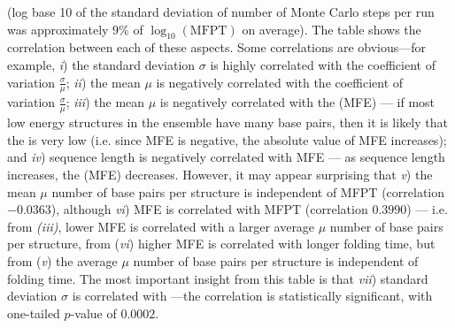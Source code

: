 \begin{table}[!ht]
{(log base 10 of the standard deviation of number of Monte Carlo
steps per run was approximately
9\% of $\log_{10}(\text{MFPT})$ on average). The table shows the correlation between each of these aspects.
Some correlations are obvious---for example,
{\em i})\;
the standard deviation $\sigma$ is highly correlated with the
coefficient of variation $\frac{\sigma}{\mu}$;
{\em ii})\;
the mean $\mu$ is negatively correlated with the
coefficient of variation $\frac{\sigma}{\mu}$;
{\em iii})\;
the mean $\mu$ is negatively correlated with the
\mfe (MFE) --- if most low energy structures in the ensemble
have many base pairs, then it is likely that the \mfe is very
low (i.e. since MFE is negative, the absolute value of MFE increases); and
{\em iv})\;
sequence length is negatively correlated with MFE --- as sequence length
increases, the \mfe (MFE) decreases.
However, it may appear surprising that
{\em v})\; the
mean $\mu$ number of base pairs per structure is independent of MFPT
(correlation $-0.0363$), although
{\em vi})\; MFE is correlated with MFPT
(correlation $0.3990$) --- i.e. from {\em (iii)},
lower MFE is correlated with a larger average $\mu$ number of base pairs per
structure, from ({\em vi})
higher MFE is correlated with longer folding time, but
from ({\em v}) the average $\mu$  number of base pairs per structure is
independent of folding time.
The most important insight from this table is that
{\em vii})\;
standard deviation $\sigma$ is correlated with \mfpt---the correlation is statistically significant, with one-tailed
$p$-value of $0.0002$.}
\label{table:correlationFFTborEmpty}
\end{table}

